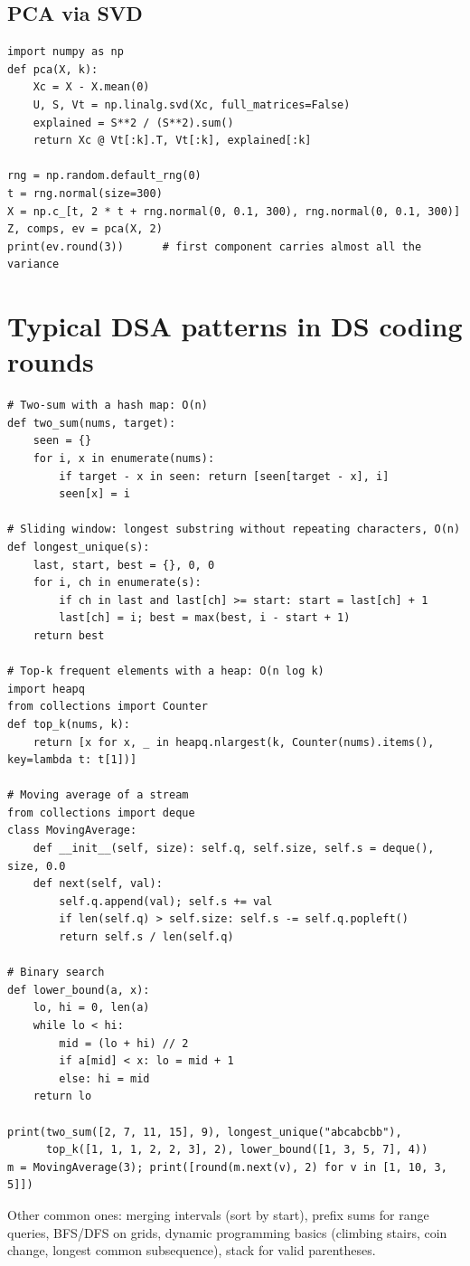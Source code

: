 \subsection{PCA via SVD}
\begin{lstlisting}[style=python]
import numpy as np
def pca(X, k):
    Xc = X - X.mean(0)
    U, S, Vt = np.linalg.svd(Xc, full_matrices=False)
    explained = S**2 / (S**2).sum()
    return Xc @ Vt[:k].T, Vt[:k], explained[:k]

rng = np.random.default_rng(0)
t = rng.normal(size=300)
X = np.c_[t, 2 * t + rng.normal(0, 0.1, 300), rng.normal(0, 0.1, 300)]
Z, comps, ev = pca(X, 2)
print(ev.round(3))      # first component carries almost all the variance
\end{lstlisting}

\section{Typical DSA patterns in DS coding rounds}
\begin{lstlisting}[style=python]
# Two-sum with a hash map: O(n)
def two_sum(nums, target):
    seen = {}
    for i, x in enumerate(nums):
        if target - x in seen: return [seen[target - x], i]
        seen[x] = i

# Sliding window: longest substring without repeating characters, O(n)
def longest_unique(s):
    last, start, best = {}, 0, 0
    for i, ch in enumerate(s):
        if ch in last and last[ch] >= start: start = last[ch] + 1
        last[ch] = i; best = max(best, i - start + 1)
    return best

# Top-k frequent elements with a heap: O(n log k)
import heapq
from collections import Counter
def top_k(nums, k):
    return [x for x, _ in heapq.nlargest(k, Counter(nums).items(), key=lambda t: t[1])]

# Moving average of a stream
from collections import deque
class MovingAverage:
    def __init__(self, size): self.q, self.size, self.s = deque(), size, 0.0
    def next(self, val):
        self.q.append(val); self.s += val
        if len(self.q) > self.size: self.s -= self.q.popleft()
        return self.s / len(self.q)

# Binary search
def lower_bound(a, x):
    lo, hi = 0, len(a)
    while lo < hi:
        mid = (lo + hi) // 2
        if a[mid] < x: lo = mid + 1
        else: hi = mid
    return lo

print(two_sum([2, 7, 11, 15], 9), longest_unique("abcabcbb"),
      top_k([1, 1, 1, 2, 2, 3], 2), lower_bound([1, 3, 5, 7], 4))
m = MovingAverage(3); print([round(m.next(v), 2) for v in [1, 10, 3, 5]])
\end{lstlisting}
Other common ones: merging intervals (sort by start), prefix sums for range queries, BFS/DFS on grids, dynamic programming basics (climbing stairs, coin change, longest common subsequence), stack for valid parentheses.

